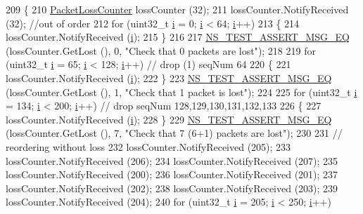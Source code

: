 \begin{DoxyCode}
209 \{
210   \hyperlink{classns3_1_1PacketLossCounter}{PacketLossCounter} lossCounter (32);
211   lossCounter.NotifyReceived (32); \textcolor{comment}{//out of order}
212   \textcolor{keywordflow}{for} (uint32\_t \hyperlink{bernuolliDistribution_8m_a6f6ccfcf58b31cb6412107d9d5281426}{i} = 0; \hyperlink{bernuolliDistribution_8m_a6f6ccfcf58b31cb6412107d9d5281426}{i} < 64; \hyperlink{bernuolliDistribution_8m_a6f6ccfcf58b31cb6412107d9d5281426}{i}++)
213     \{
214       lossCounter.NotifyReceived (\hyperlink{bernuolliDistribution_8m_a6f6ccfcf58b31cb6412107d9d5281426}{i});
215     \}
216 
217   \hyperlink{group__testing_ga2a9d78cffb3db8e867c35fff0b698cf5}{NS\_TEST\_ASSERT\_MSG\_EQ} (lossCounter.GetLost (), 0, \textcolor{stringliteral}{"Check that 0 packets are lost"});
218 
219   \textcolor{keywordflow}{for} (uint32\_t \hyperlink{bernuolliDistribution_8m_a6f6ccfcf58b31cb6412107d9d5281426}{i} = 65; \hyperlink{bernuolliDistribution_8m_a6f6ccfcf58b31cb6412107d9d5281426}{i} < 128; \hyperlink{bernuolliDistribution_8m_a6f6ccfcf58b31cb6412107d9d5281426}{i}++) \textcolor{comment}{// drop (1) seqNum 64}
220     \{
221       lossCounter.NotifyReceived (\hyperlink{bernuolliDistribution_8m_a6f6ccfcf58b31cb6412107d9d5281426}{i});
222     \}
223   \hyperlink{group__testing_ga2a9d78cffb3db8e867c35fff0b698cf5}{NS\_TEST\_ASSERT\_MSG\_EQ} (lossCounter.GetLost (), 1, \textcolor{stringliteral}{"Check that 1 packet is lost"});
224 
225   \textcolor{keywordflow}{for} (uint32\_t \hyperlink{bernuolliDistribution_8m_a6f6ccfcf58b31cb6412107d9d5281426}{i} = 134; \hyperlink{bernuolliDistribution_8m_a6f6ccfcf58b31cb6412107d9d5281426}{i} < 200; \hyperlink{bernuolliDistribution_8m_a6f6ccfcf58b31cb6412107d9d5281426}{i}++) \textcolor{comment}{// drop seqNum 128,129,130,131,132,133}
226     \{
227       lossCounter.NotifyReceived (\hyperlink{bernuolliDistribution_8m_a6f6ccfcf58b31cb6412107d9d5281426}{i});
228     \}
229   \hyperlink{group__testing_ga2a9d78cffb3db8e867c35fff0b698cf5}{NS\_TEST\_ASSERT\_MSG\_EQ} (lossCounter.GetLost (), 7, \textcolor{stringliteral}{"Check that 7 (6+1) packets are
       lost"});
230 
231   \textcolor{comment}{// reordering without loss}
232   lossCounter.NotifyReceived (205);
233   lossCounter.NotifyReceived (206);
234   lossCounter.NotifyReceived (207);
235   lossCounter.NotifyReceived (200);
236   lossCounter.NotifyReceived (201);
237   lossCounter.NotifyReceived (202);
238   lossCounter.NotifyReceived (203);
239   lossCounter.NotifyReceived (204);
240   \textcolor{keywordflow}{for} (uint32\_t \hyperlink{bernuolliDistribution_8m_a6f6ccfcf58b31cb6412107d9d5281426}{i} = 205; \hyperlink{bernuolliDistribution_8m_a6f6ccfcf58b31cb6412107d9d5281426}{i} < 250; \hyperlink{bernuolliDistribution_8m_a6f6ccfcf58b31cb6412107d9d5281426}{i}++)

\end{DoxyCode}
